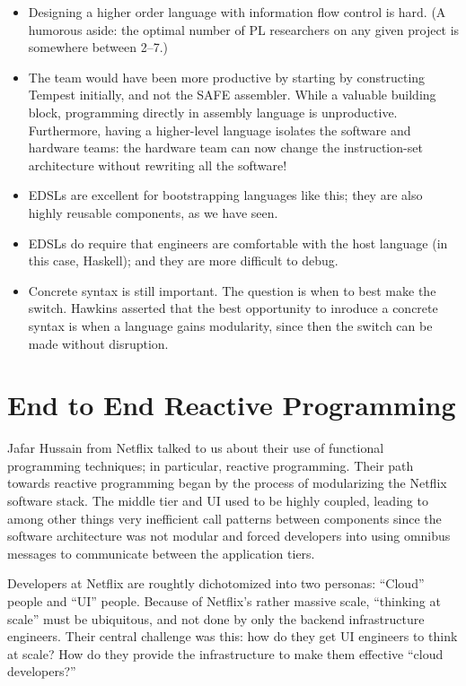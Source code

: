 \documentclass{jfp1}
\begin{document}
\begin{itemize}

\item Designing a higher order language with information flow control
is hard. (A humorous aside: the optimal number of PL researchers on
any given project is somewhere between 2--7.)

\item The team would have been more productive by starting by constructing
Tempest initially, and not the SAFE assembler. While a valuable building block,
programming directly in assembly language is unproductive. Furthermore,
having a higher-level language isolates the software and hardware teams:
the hardware team can now change the instruction-set architecture
without rewriting all the software!

\item EDSLs are excellent for bootstrapping languages like this; they are also 
highly reusable components, as we have seen.

\item EDSLs do require that engineers are comfortable with the host language
(in this case, Haskell); and they are more difficult to debug.

\item Concrete syntax is still important. The question is when to best make
the switch. Hawkins asserted that the best opportunity to inroduce a concrete
syntax is when a language gains modularity, since then the switch can be made
without disruption.

\end{itemize}

\section{End to End Reactive Programming}


Jafar Hussain from Netflix talked to us about their use of functional
programming techniques; in particular, reactive programming. Their
path towards reactive programming began by the process of
modularizing the Netflix software stack. The middle tier and UI
used to be highly coupled, leading to among other things very
inefficient call patterns between components since the software
architecture was not modular and forced developers into using
omnibus messages to communicate between the application tiers.

Developers at Netflix are roughtly dichotomized into two personas:
``Cloud'' people and ``UI'' people. Because of Netflix's rather
massive scale, ``thinking at scale'' must be ubiquitous, and not done
by only the backend infrastructure engineers. Their central challenge
was this: how do they get UI engineers to think at scale? How do they
provide the infrastructure to make them effective ``cloud
developers?''
\end{document}
